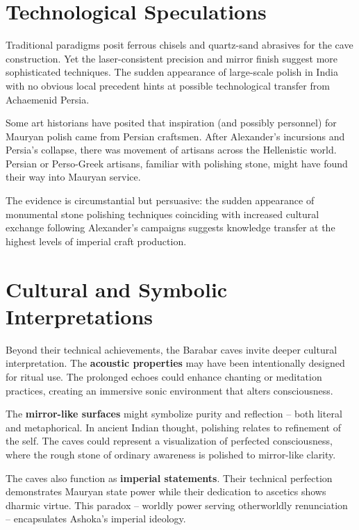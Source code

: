 \documentclass[11pt]{article}
\begin{document}
\section{Technological Speculations}

Traditional paradigms posit ferrous chisels and quartz-sand abrasives for the cave construction. Yet the laser-consistent precision and mirror finish suggest more sophisticated techniques. The sudden appearance of large-scale polish in India with no obvious local precedent hints at possible technological transfer from Achaemenid Persia.

Some art historians have posited that inspiration (and possibly personnel) for Mauryan polish came from Persian craftsmen. After Alexander's incursions and Persia's collapse, there was movement of artisans across the Hellenistic world. Persian or Perso-Greek artisans, familiar with polishing stone, might have found their way into Mauryan service.

The evidence is circumstantial but persuasive: the sudden appearance of monumental stone polishing techniques coinciding with increased cultural exchange following Alexander's campaigns suggests knowledge transfer at the highest levels of imperial craft production.

\section{Cultural and Symbolic Interpretations}

Beyond their technical achievements, the Barabar caves invite deeper cultural interpretation. The \textbf{acoustic properties} may have been intentionally designed for ritual use. The prolonged echoes could enhance chanting or meditation practices, creating an immersive sonic environment that alters consciousness.

The \textbf{mirror-like surfaces} might symbolize purity and reflection -- both literal and metaphorical. In ancient Indian thought, polishing relates to refinement of the self. The caves could represent a visualization of perfected consciousness, where the rough stone of ordinary awareness is polished to mirror-like clarity.

The caves also function as \textbf{imperial statements}. Their technical perfection demonstrates Mauryan state power while their dedication to ascetics shows dharmic virtue. This paradox -- worldly power serving otherworldly renunciation -- encapsulates Ashoka's imperial ideology.
\end{document}
